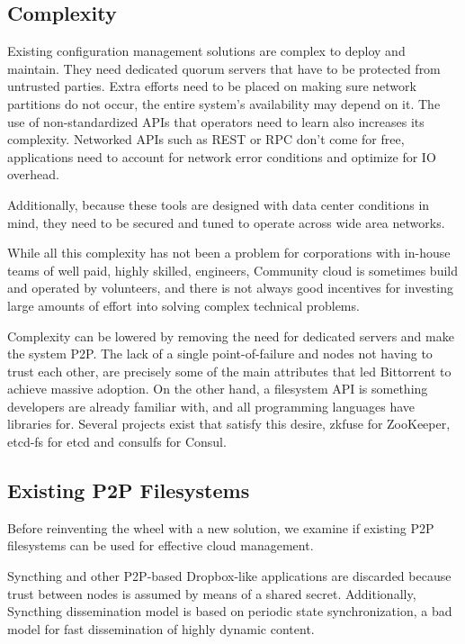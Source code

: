 \documentclass{sig-alternate}
\begin{document}
\subsection{Complexity}

Existing configuration management solutions are complex to deploy and maintain. They need dedicated quorum servers that have to be protected from untrusted parties. Extra efforts need to be placed on making sure network partitions do not occur, the entire system's availability may depend on it. The use of non-standardized APIs that operators need to learn also increases its complexity. Networked APIs such as REST or RPC don't come for free, applications need to account for network error conditions and optimize for IO overhead.

Additionally, because these tools are designed with data center conditions in mind, they need to be secured and tuned to operate across wide area networks.

While all this complexity has not been a problem for corporations with in-house teams of well paid, highly skilled, engineers, Community cloud is sometimes build and operated by volunteers, and there is not always good incentives for investing large amounts of effort into solving complex technical problems.

Complexity can be lowered by removing the need for dedicated servers and make the system P2P. The lack of a single point-of-failure and nodes not having to trust each other, are precisely some of the main attributes that led Bittorrent to achieve massive adoption. On the other hand, a filesystem API is something developers are already familiar with, and all programming languages have libraries for. Several projects exist that satisfy this desire, zkfuse \cite{zkfuse} for ZooKeeper, etcd-fs \cite{etcd-fs} for etcd and consulfs \cite{consulfs} for Consul.

\subsection{Existing P2P Filesystems}

Before reinventing the wheel with a new solution, we examine if existing P2P filesystems can be used for effective cloud management.

Syncthing\cite{syncthing} and other P2P-based Dropbox-like applications are discarded because trust between nodes is assumed by means of a shared secret. Additionally, Syncthing dissemination model is based on periodic state synchronization, a bad model for fast dissemination of highly dynamic content.
\end{document}
